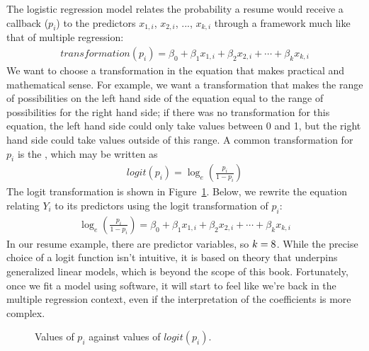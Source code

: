 The logistic regression model relates the probability
a resume would receive a callback ($p_i$) to the predictors
$x_{1,i}$, $x_{2,i}$, ..., $x_{k,i}$
through a framework much like that of multiple regression:
\begin{align}
transformation(p_{i})
  = \beta_0 +
      \beta_1x_{1,i} +
      \beta_2 x_{2,i} +
      \cdots +
      \beta_k x_{k,i}
\label{linkTransformationEquation}
\end{align}
We want to choose a transformation in the equation
that makes practical and mathematical sense.
For example, we want a transformation that makes
the range of possibilities on the left hand side
of the equation equal to the range of possibilities
for the right hand side;
if there was no transformation for this equation,
the left hand side could only take values between 0 and 1,
but the right hand side could take values outside of this
range.
A common transformation for $p_i$ is the , which may be written as
\begin{align*}
logit(p_i) = \log_{e}\left( \frac{p_i}{1-p_i} \right)
\end{align*}
The logit transformation is shown in
Figure~\ref{logitTransformationFigureHoriz}.
Below, we rewrite the equation relating $Y_i$ to its
predictors using the logit transformation of $p_i$:
\begin{align*}
\log_{e}\left( \frac{p_i}{1-p_i} \right)
  = \beta_0 +
      \beta_1 x_{1,i} +
      \beta_2 x_{2,i} +
      \cdots +
      \beta_k x_{k,i}
\end{align*}
In our resume example, there are \resNumPred{} predictor
variables, so $k = 8{}$.
While the precise choice of a logit function isn't intuitive,
it is based on theory that underpins generalized linear models,
which is beyond the scope of this book.
Fortunately, once we fit a model using software,
it will start to feel like we're back in the
multiple regression context, even if the
interpretation of the coefficients is more complex.

\begin{figure}
  \centering
  \caption{Values of $p_i$ against values of $logit(p_i)$.}
  \label{logitTransformationFigureHoriz}
\end{figure}

